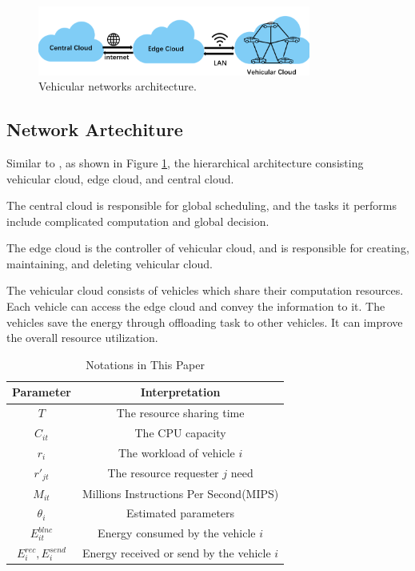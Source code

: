 \documentclass[conference]{IEEEtran}
\begin{document}
	
	\begin{figure}[t]
		\centering
		\includegraphics[width=0.80\textwidth]{pic2.png}
		\caption{Vehicular networks architecture. }
		\label{cloud}
		
	\end{figure}
	
	\subsection{Network Artechiture}
	Similar to \cite{yu2013toward}, as shown in Figure \ref{cloud}, the hierarchical architecture consisting vehicular cloud, edge cloud, and central cloud. 
	
	The central cloud is responsible for global scheduling, and the tasks it performs include complicated computation and global decision. 
	
	The edge cloud is the controller of vehicular cloud, and is responsible for creating, maintaining, and deleting vehicular cloud. 
	
	The vehicular cloud consists of vehicles which share their computation resources. Each vehicle can access the edge cloud and convey the information to it. The vehicles save the energy through offloading task to other vehicles. It can improve the overall resource utilization.  
	
	
	
	
	\begin{table}[]
		\centering
		\caption{Notations in This Paper}
		\begin{tabular}{|c|c|}
			\hline
			Parameter    &    Interpretation\\
			\hline
			
			$T$	          & The resource sharing time   \\
			$C_{it}$      &   The CPU capacity    \\
			$r_i $   &   The workload of vehicle $i$ \\
			$r'_{jt} $ 	  &   The resource requester $j$ need    \\
			$M_{it}$      &   Millions Instructions Per Second(MIPS)   \\
			$\theta _i   $      &  Estimated parameters   \\
			
			$E^{blnc}_{it}$   &   Energy consumed by the vehicle $i$  \\
			
			$E^{rec}_i, E^{send}_i$ & Energy received or send by the vehicle $i$  \\
			
			
			\hline
		\end{tabular}
	\end{table}
	
\end{document}
